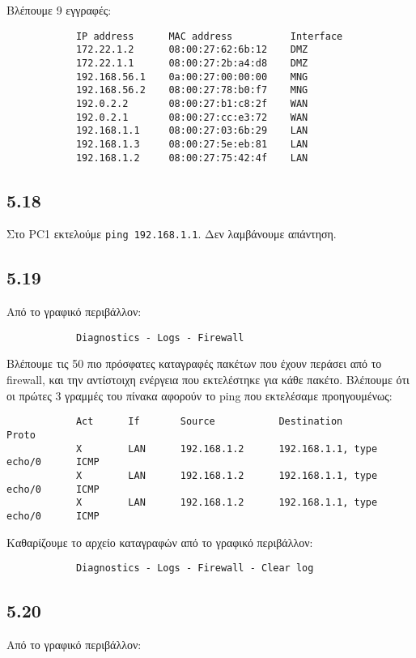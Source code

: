 \documentclass[a4paper, 12pt]{article}
\begin{document}
		Βλέπουμε 9 εγγραφές:
		
		\begin{verbatim}
			IP address      MAC address          Interface
			172.22.1.2      08:00:27:62:6b:12    DMZ
			172.22.1.1      08:00:27:2b:a4:d8    DMZ
			192.168.56.1    0a:00:27:00:00:00    MNG
			192.168.56.2    08:00:27:78:b0:f7    MNG
			192.0.2.2       08:00:27:b1:c8:2f    WAN
			192.0.2.1       08:00:27:cc:e3:72    WAN
			192.168.1.1     08:00:27:03:6b:29    LAN
			192.168.1.3     08:00:27:5e:eb:81    LAN
			192.168.1.2     08:00:27:75:42:4f    LAN
		\end{verbatim}

	\subsection*{5.18}
		Στο PC1 εκτελούμε \verb|ping 192.168.1.1|. Δεν λαμβάνουμε απάντηση.

	\subsection*{5.19}
		Από το γραφικό περιβάλλον:
		
		\begin{verbatim}
			Diagnostics - Logs - Firewall
		\end{verbatim}

		Βλέπουμε τις 50 πιο πρόσφατες καταγραφές πακέτων που έχουν περάσει από το firewall, και την αντίστοιχη ενέργεια που εκτελέστηκε για κάθε πακέτο. Βλέπουμε ότι οι πρώτες 3 γραμμές του πίνακα αφορούν το ping που εκτελέσαμε προηγουμένως:
		
		\begin{verbatim}
			Act      If       Source           Destination                   Proto
			X        LAN      192.168.1.2      192.168.1.1, type echo/0      ICMP
			X        LAN      192.168.1.2      192.168.1.1, type echo/0      ICMP
			X        LAN      192.168.1.2      192.168.1.1, type echo/0      ICMP
		\end{verbatim}
		
		Καθαρίζουμε το αρχείο καταγραφών από το γραφικό περιβάλλον:
		
		\begin{verbatim}
			Diagnostics - Logs - Firewall - Clear log
		\end{verbatim}

	\subsection*{5.20}
		Από το γραφικό περιβάλλον:
		
\end{document}

